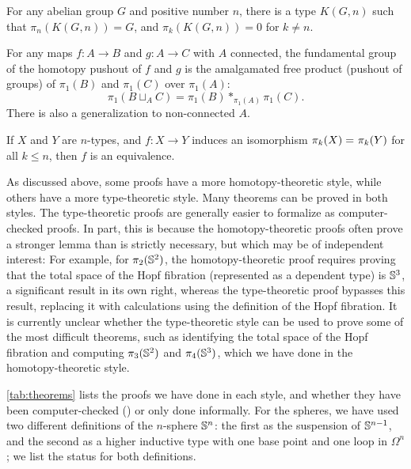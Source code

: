 \begin{thm}
For any abelian group $G$ and positive number $n$, there is a type
$K(G,n)$ such that $\pi_n(K(G,n)) = G$, and  $\pi_k(K(G,n)) = 0$
for $k\neq n$.
\end{thm}

\begin{thm}
For any maps $f:A\to B$ and $g:A\to C$ with $A$ connected, the fundamental group of the homotopy pushout of $f$ and $g$ is the amalgamated free product (pushout of groups) of $\pi_1(B)$ and $\pi_1(C)$ over $\pi_1(A)$:
\[ \pi_1(B\sqcup_A C) = \pi_1(B) *_{\pi_1(A)} \pi_1(C).\]
There is also a generalization to non-connected $A$.
\end{thm}

\begin{thm}
If $X$ and $Y$ are $n$-types, and $f : X \rightarrow Y$ induces an
isomorphism $\pi_k(X) =_{} \pi_k(Y)$ for all $k \le n$, then $f$ is an
equivalence.
\end{thm}

As discussed above, some proofs have a more homotopy-theoretic style,
while others have a more type-theoretic style.  Many theorems can be
proved in both styles.  The type-theoretic proofs are generally easier
to formalize as computer-checked proofs.  In part, this is because the
homotopy-theoretic proofs often prove a stronger lemma than is strictly
necessary, but which may be of independent interest: For example, for
$\pi_2(\mathbb{S} ^2)$, the homotopy-theoretic proof requires proving that the
total space of the Hopf fibration (represented as a dependent type) is
$\mathbb{S} ^3$, a significant result in its own right, whereas the
type-theoretic proof bypasses this result, replacing it with
calculations using the definition of the Hopf fibration.  It is
currently unclear whether the type-theoretic style can be used to prove
some of the most difficult theorems, such as identifying the total space of the Hopf
fibration and computing $\pi_3(\mathbb{S} ^2)$ and $\pi_4(\mathbb{S} ^3)$, which we have done in
the homotopy-theoretic style.

\autoref{tab:theorems} lists the proofs we have done in each style, and
whether they have been computer-checked (\checkmark) or only done
informally.  For the spheres, we have used two different definitions of
the $n$-sphere $\mathbb{S} ^n$: the first as the suspension of $\mathbb{S} ^ {n-1}$,
and the second as a higher inductive type with one base point and one
loop in $\Omega^n$; we list the status for both definitions.

